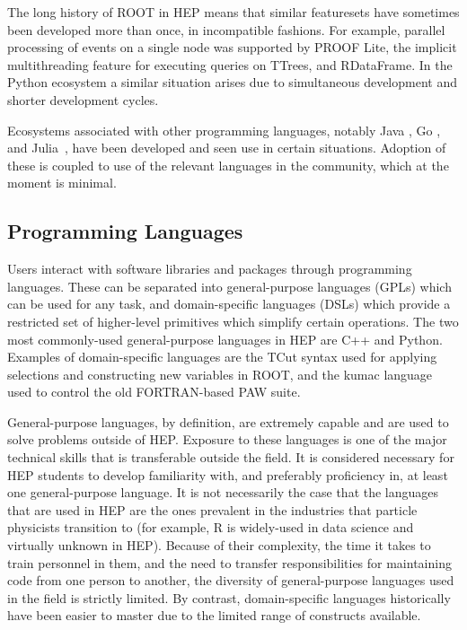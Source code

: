 The long history of ROOT in HEP means that similar featuresets have sometimes been developed more than once, in incompatible fashions. For example, parallel processing of events on a single node was supported by PROOF Lite, the implicit multithreading feature for executing queries on TTrees, and RDataFrame. In the Python ecosystem a similar situation arises due to simultaneous development and shorter development cycles.

Ecosystems associated with other programming languages, notably Java \cite{Chekanov:2020bja}, Go \cite{Binet:2018xcc}, and Julia~\cite{bezanson2017julia}, have been developed and seen use in certain situations. Adoption of these is coupled to use of the relevant languages in the community, which at the moment is minimal.

\subsection{Programming Languages}
Users interact with software libraries and packages through programming languages. These can be separated into general-purpose languages (GPLs) which can be used for any task, and domain-specific languages (DSLs) which provide a restricted set of higher-level primitives which simplify certain operations. The two most commonly-used general-purpose languages in HEP are C++ and Python. Examples of domain-specific languages are the TCut syntax used for applying selections and constructing new variables in ROOT, and the kumac language used to control the old FORTRAN-based PAW suite.

General-purpose languages, by definition, are extremely capable and are used to solve problems outside of HEP. Exposure to these languages is one of the major technical skills that is transferable outside the field. It is considered necessary for HEP students to develop familiarity with, and preferably proficiency in, at least one general-purpose language. It is not necessarily the case that the languages that are used in HEP are the ones prevalent in the industries that particle physicists transition to (for example, R is widely-used in data science and virtually unknown in HEP). Because of their complexity, the time it takes to train personnel in them, and the need to transfer responsibilities for maintaining code from one person to another, the diversity of general-purpose languages used in the field is strictly limited. By contrast, domain-specific languages historically have been easier to master due to the limited range of constructs available.

